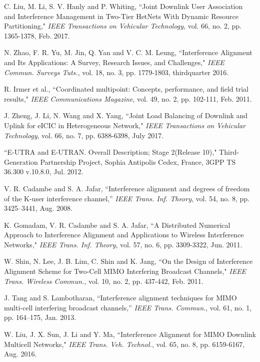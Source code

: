 \documentclass[journal]{IEEEtran}
\begin{document}
\begin{thebibliography}{1}
C. Liu, M. Li, S. V. Hanly and P. Whiting, ``Joint Downlink User Association and Interference Management in Two-Tier HetNets With Dynamic Resource Partitioning," \textit{IEEE Transactions on Vehicular Technology}, vol. 66, no. 2, pp. 1365-1378, Feb. 2017.

N. Zhao, F. R. Yu, M. Jin, Q. Yan and V. C. M. Leung, ``Interference Alignment and Its Applications: A Survey, Research Issues, and Challenges," \textit{IEEE Commun. Surveys Tuts.}, vol. 18, no. 3, pp. 1779-1803, thirdquarter 2016.

R. Irmer et al., ``Coordinated multipoint: Concepts, performance, and field trial results," \textit{IEEE Communications Magazine}, vol. 49, no. 2, pp. 102-111, Feb. 2011.

J. Zheng, J. Li, N. Wang and X. Yang, ``Joint Load Balancing of Downlink and Uplink for eICIC in Heterogeneous Network," \textit{IEEE Transactions on Vehicular Technology}, vol. 66, no. 7, pp. 6388-6398, July 2017.

``E-UTRA and E-UTRAN. Overall Description; Stage 2(Release 10),"
Third-Generation Partnership Project, Sophia Antipolis Cedex, France,
3GPP TS 36.300 v.10.8.0, Jul. 2012.

V. R. Cadambe and S. A. Jafar, ``Interference alignment and degrees of freedom of the K-user interference channel,” \textit{IEEE Trans. Inf. Theory}, vol. 54, no. 8, pp. 3425–3441, Aug. 2008.

K. Gomadam, V. R. Cadambe and S. A. Jafar, ``A Distributed Numerical Approach to Interference Alignment and Applications to Wireless Interference Networks," \textit{IEEE Trans. Inf. Theory}, vol. 57, no. 6, pp. 3309-3322, Jun. 2011.

W. Shin, N. Lee, J. B. Lim, C. Shin and K. Jang, ``On the Design of Interference Alignment Scheme for Two-Cell MIMO Interfering Broadcast Channels," \textit{IEEE Trans. Wireless Commun.}, vol. 10, no. 2, pp. 437-442, Feb. 2011. 

J. Tang and S. Lambotharan, ``Interference alignment techniques for MIMO multi-cell interfering broadcast channels,” \textit{IEEE Trans. Commun.}, vol. 61, no. 1, pp. 164–175, Jan. 2013.

W. Liu, J. X. Sun, J. Li and Y. Ma, ``Interference Alignment for MIMO Downlink Multicell Networks," \textit{IEEE Trans. Veh. Technol.}, vol. 65, no. 8, pp. 6159-6167, Aug. 2016. 


\end{thebibliography}
\end{document}
